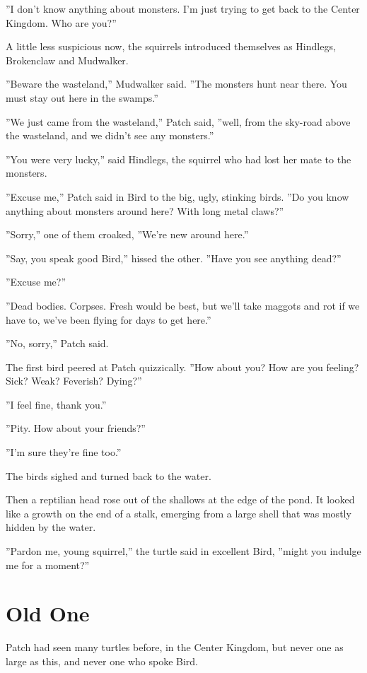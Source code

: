 \documentclass[12pt]{book}
\begin{document}
''I don't know anything about monsters. I'm just trying to get back to the Center Kingdom. Who are you?''

A little less suspicious now, the squirrels introduced themselves as Hindlegs, Brokenclaw and Mudwalker.

''Beware the wasteland,'' Mudwalker said. ''The monsters hunt near there. You must stay out here in the swamps.''

''We just came from the wasteland,'' Patch said, ''well, from the sky-road above the wasteland, and we didn't see any monsters.''

''You were very lucky,'' said Hindlegs, the squirrel who had lost her mate to the monsters. 

''Excuse me,'' Patch said in Bird to the big, ugly, stinking birds. ''Do you know anything about monsters around here? With long metal claws?''

''Sorry,'' one of them croaked, ''We're new around here.''

''Say, you speak good Bird,'' hissed the other. ''Have you see anything dead?''

''Excuse me?''

''Dead bodies. Corpses. Fresh would be best, but we'll take maggots and rot if we have to, we've been flying for days to get here.''

''No, sorry,'' Patch said.

The first bird peered at Patch quizzically. ''How about you? How are you feeling? Sick? Weak? Feverish? Dying?''

''I feel fine, thank you.''

''Pity. How about your friends?''

''I'm sure they're fine too.''

The birds sighed and turned back to the water.

Then a reptilian head rose out of the shallows at the edge of the pond. It looked like a growth on the end of a stalk, emerging from a large shell that was mostly hidden by the water.

''Pardon me, young squirrel,'' the turtle said in excellent Bird, ''might you indulge me for a moment?''


\section{Old One}

Patch had seen many turtles before, in the Center Kingdom, but never one as large as this, and never one who spoke Bird.
\end{document}
